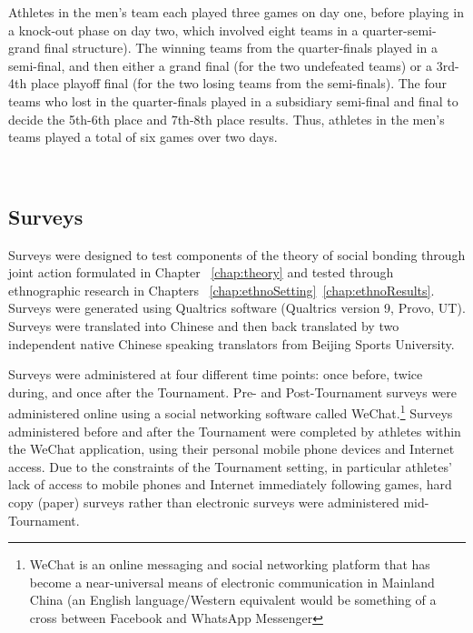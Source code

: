 \begin{CJK}{UTF8}{gbsn}
Athletes in the men's team each played three games on day one, before playing in a knock-out phase on day two, which involved eight teams in a quarter-semi-grand final structure). The winning teams from the quarter-finals played in a semi-final, and then either a grand final (for the two undefeated teams) or a 3rd-4th place playoff final (for the two losing teams from the semi-finals). The four teams who lost in the quarter-finals played in a subsidiary semi-final and final to decide the 5th-6th place and 7th-8th place results. Thus, athletes in the men's teams played a total of six games over two days.

\\



\subsection{Surveys}
Surveys were designed to test components of the theory of social bonding through joint action formulated in Chapter ~\ref{chap:theory} and tested through ethnographic research in Chapters ~\ref{chap:ethnoSetting}\nobreakdash~\ref{chap:ethnoResults}.  Surveys were generated using Qualtrics software (Qualtrics version 9, Provo, UT). Surveys were translated into Chinese and then back translated by two independent native Chinese speaking translators from Beijing Sports University.

Surveys were administered at four different time points: once before, twice during, and once after the Tournament.  Pre- and Post-Tournament surveys were administered online using a social networking software called WeChat.\footnote{WeChat is an online messaging and social networking platform that has become a near-universal means of electronic communication in Mainland China (an English language/Western equivalent would be something of a cross between Facebook and WhatsApp Messenger} Surveys administered before and after the Tournament were completed by athletes within the WeChat application, using their personal mobile phone devices and Internet access.  Due to the constraints of the Tournament setting, in particular athletes’ lack of access to mobile phones and Internet immediately following games, hard copy (paper) surveys rather than electronic surveys were administered mid-Tournament.




\end{CJK}
